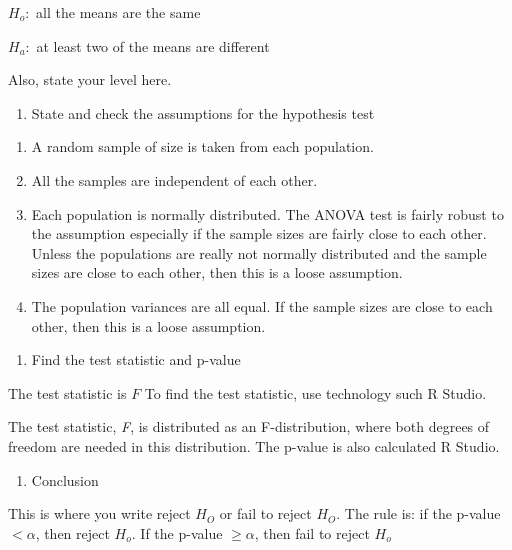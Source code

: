 \documentclass[]{book}
\providecommand{\tightlist}{%
  \setlength{\itemsep}{0pt}\setlength{\parskip}{0pt}}
\begin{document}
\(H_o:\) all the means are the same

\(H_a:\) at least two of the means are different

Also, state your level here.

\begin{enumerate}
\def\labelenumi{\arabic{enumi}.}
\setcounter{enumi}{2}
\tightlist
\item
  State and check the assumptions for the hypothesis test
\end{enumerate}

\begin{enumerate}
\def\labelenumi{\alph{enumi}.}
\item
  A random sample of size is taken from each population.
\item
  All the samples are independent of each other.
\item
  Each population is normally distributed. The ANOVA test is fairly robust to the assumption especially if the sample sizes are fairly close to each other. Unless the populations are really not normally distributed and the sample sizes are close to each other, then this is a loose assumption.
\item
  The population variances are all equal. If the sample sizes are close to each other, then this is a loose assumption.
\end{enumerate}

\begin{enumerate}
\def\labelenumi{\arabic{enumi}.}
\setcounter{enumi}{3}
\tightlist
\item
  Find the test statistic and p-value
\end{enumerate}

The test statistic is \(F\) To find the test statistic, use technology such R Studio.

The test statistic, \emph{F}, is distributed as an F-distribution, where both degrees of freedom are needed in this distribution. The p-value is also calculated R Studio.

\begin{enumerate}
\def\labelenumi{\arabic{enumi}.}
\setcounter{enumi}{4}
\tightlist
\item
  Conclusion
\end{enumerate}

This is where you write reject \(H_O\) or fail to reject \(H_O\). The rule is: if the p-value \(<\alpha\), then reject \(H_o\). If the p-value \(\ge \alpha\), then fail to reject \(H_o\)
\end{document}
